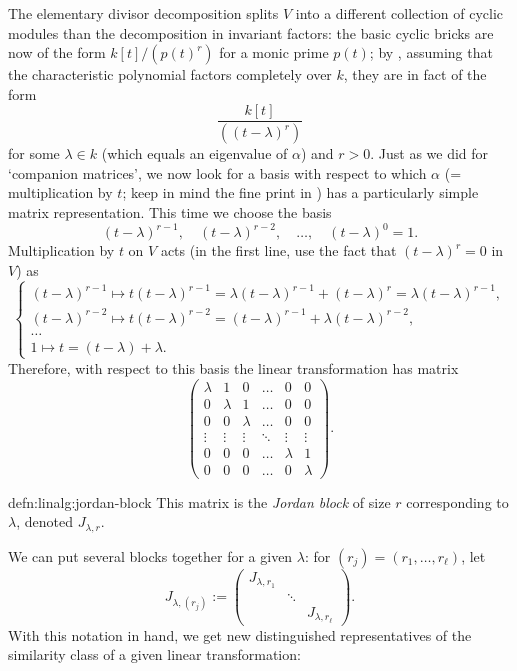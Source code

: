 The elementary divisor decomposition splits $V$ into a different
collection of cyclic modules than the decomposition in invariant
factors: the basic cyclic bricks are now of the form $k[t]/(p(t)^r)$
for a monic prime $p(t)$; by , assuming that
the characteristic polynomial factors completely over $k$, they are in
fact of the form
\[
  \frac{k[t]}{((t - \lambda)^r)}
\]
for some $\lambda \in k$ (which equals an eigenvalue of $\alpha$) and
$r > 0$. Just as we did for `companion matrices', we now look for a
basis with respect to which $\alpha$ (= multiplication by $t$; keep in
mind the fine print in ) has a particularly
simple matrix representation. This time we choose the basis
\[
  (t - \lambda)^{r-1}, \quad (t - \lambda)^{r-2}, \quad \dots, \quad
  (t - \lambda)^0 = 1.
\]
Multiplication by $t$ on $V$ acts (in the first line, use the fact
that $(t - \lambda)^r = 0$ in $V$) as
\[
  \begin{cases}
    (t - \lambda)^{r-1} \mapsto t(t - \lambda)^{r-1} = \lambda(t -
    \lambda)^{r-1} + (t - \lambda)^r = \lambda(t - \lambda)^{r-1}, \\
    (t - \lambda)^{r-2} \mapsto t(t - \lambda)^{r-2} = (t - \lambda)^{r-1} +
    \lambda(t - \lambda)^{r-2}, \\
    \dots \\
    1 \mapsto t = (t - \lambda) + \lambda.
  \end{cases}
\]
Therefore, with respect to this basis the linear transformation has
matrix
\[
  \begin{pmatrix}
    \lambda & 1 & 0 & \dots & 0 & 0 \\
    0 & \lambda & 1 & \dots & 0 & 0 \\
    0 & 0 & \lambda & \dots & 0 & 0 \\
    \vdots & \vdots & \vdots & \ddots & \vdots & \vdots \\
    0 & 0 & 0 & \dots & \lambda & 1 \\
    0 & 0 & 0 & \dots & 0 & \lambda
  \end{pmatrix}.
\]

\begin{defn}{}{defn:linalg:jordan-block}
  This matrix is the \emph{Jordan block} of size $r$ corresponding to
  $\lambda$, denoted $J_{\lambda, r}$.
\end{defn}

We can put several blocks together for a given $\lambda$: for
$(r_j) = (r_1, \dots, r_\ell)$, let
\[
  J_{\lambda, (r_j)} := \begin{pmatrix}
    J_{\lambda, r_1} & & \\
                     & \ddots & \\
                     & & J_{\lambda, r_\ell}
  \end{pmatrix}.
\]
With this notation in hand, we get new distinguished representatives
of the similarity class of a given linear transformation:

